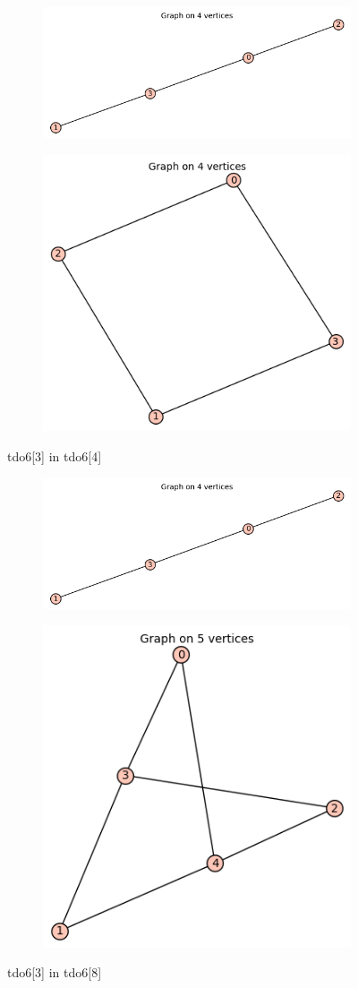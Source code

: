 \documentclass[12pt, a4paper]{article}
\begin{document}
\begin{center}
\begin{figure}[!htb]
\centering
\begin{subfigure}{0.5\textwidth}
  \centering
  \includegraphics[width=0.5\linewidth]{tdo6[3]}
\end{subfigure}%
\begin{subfigure}{0.5\textwidth}
  \centering
  \includegraphics[width=0.5\linewidth]{tdo6[4]}
\end{subfigure}
\caption{tdo6[3] in tdo6[4]}
\label{fig:test}
\end{figure}

\begin{figure}[!htb]
\centering
\begin{subfigure}{0.5\textwidth}
  \centering
  \includegraphics[width=0.5\linewidth]{tdo6[3]}
\end{subfigure}%
\begin{subfigure}{0.5\textwidth}
  \centering
  \includegraphics[width=0.5\linewidth]{tdo6[8]}
\end{subfigure}
\caption{tdo6[3] in tdo6[8]}
\label{fig:test}
\end{figure}


\end{center}
\end{document}
